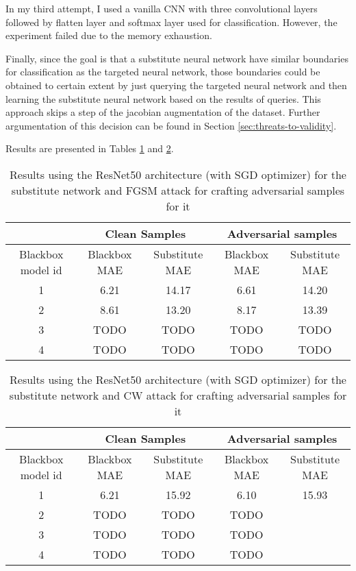 In my third attempt, I used a vanilla CNN with three convolutional layers followed by flatten layer and softmax layer used for classification. However, the experiment failed due to the memory exhaustion.

Finally, since the goal is that a substitute neural network have similar boundaries for classification as the targeted neural network, those boundaries could be obtained to certain extent by just querying the targeted neural network and then learning the substitute neural network based on the results of queries. This approach skips a step of the jacobian augmentation of the dataset. Further argumentation of this decision can be found in Section \ref{sec:threats-to-validity}.

Results are presented in Tables \ref{table:bbox-fgsm-resnet} and \ref{table:bbox-cw-resnet}.

\begin{table}[]
\begin{tabular}{|c|c|c|c|c|}
\hline
 & \multicolumn{2}{c|}{Clean Samples} & \multicolumn{2}{c|}{Adversarial samples} \\ \hline
Blackbox model id & Blackbox MAE & Substitute MAE & Blackbox MAE & Substitute MAE \\ \hline
1 & 6.21 & 14.17 & 6.61 & 14.20 \\ \hline
2 & 8.61 & 13.20  &  8.17 & 13.39  \\ \hline
3 & TODO & TODO  & TODO & TODO  \\ \hline
4 & TODO & TODO & TODO & TODO \\ \hline
\end{tabular}
\caption{Results using the ResNet50 architecture (with SGD optimizer) for the substitute network and FGSM attack for crafting adversarial samples for it}
\label{table:bbox-fgsm-resnet}
\end{table}


\begin{table}[]
\begin{tabular}{|c|c|c|c|c|}
\hline
 & \multicolumn{2}{c|}{Clean Samples} & \multicolumn{2}{c|}{Adversarial samples} \\ \hline
Blackbox model id & Blackbox MAE & Substitute MAE & Blackbox MAE & Substitute MAE \\ \hline
1 & 6.21 & 15.92 & 6.10 & 15.93 \\ \hline
2 &  TODO & TODO  & TODO &  \\ \hline
3 &  TODO & TODO  & TODO &  \\ \hline
4 &  TODO & TODO  & TODO &  \\ \hline
\end{tabular}
\caption{Results using the ResNet50 architecture (with SGD optimizer) for the substitute network and CW attack for crafting adversarial samples for it}
\label{table:bbox-cw-resnet}
\end{table}

